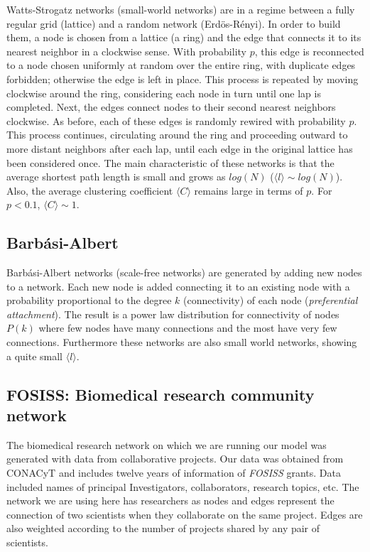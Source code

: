 \documentclass{bmcart}
\begin{document}
Watts-Strogatz networks \cite{WattsStrogatz:98} (small-world networks)
are in a regime between a fully regular grid (lattice) and a random
network (Erd\"{o}s-R\'enyi). In order to build them, a node is chosen
from a lattice (a ring) and the edge that connects it to its nearest
neighbor in a clockwise sense. With probability $p$, this edge is
reconnected to a node chosen uniformly at random over the entire ring,
with duplicate edges forbidden; otherwise the edge is left in
place. This process is repeated by moving clockwise around the ring,
considering each node in turn until one lap is completed. Next, the
edges connect nodes to their second nearest neighbors clockwise. As
before, each of these edges is randomly rewired with probability
$p$. This process continues, circulating around the ring and
proceeding outward to more distant neighbors after each lap, until
each edge in the original lattice has been considered once. The main
characteristic of these networks is that the average shortest path
length is small and grows as $log(N)$
($\langle l \rangle \sim log(N)$). Also, the average clustering
coefficient $\langle C \rangle$ remains large in terms of $p$. For
$p < 0.1$, $\langle C \rangle \sim 1$.

\subsection*{Barb\'asi-Albert}

Barb\'asi-Albert networks \cite{BarabasiAlbert:99} (scale-free
networks) are generated by adding new nodes to a network. Each new
node is added connecting it to an existing node with a probability
proportional to the degree $k$ (connectivity) of each node
(\textit{preferential attachment}). The result is a power law
distribution for connectivity of nodes $P(k)$ where few nodes have
many connections and the most have very few connections. Furthermore
these networks are also small world networks, showing a quite small
$\langle l \rangle$.


\subsection*{FOSISS: Biomedical research community network}

The biomedical research network on which we are running our model was
generated with data from collaborative projects. Our data was obtained
from CONACyT and includes twelve years of information of
\textit{FOSISS} grants. Data included names of principal
Investigators, collaborators, research topics, etc. The network we are
using here has researchers as nodes and edges represent the connection
of two scientists when they collaborate on the same project. Edges are
also weighted according to the number of projects shared by any pair
of scientists.
\end{document}
